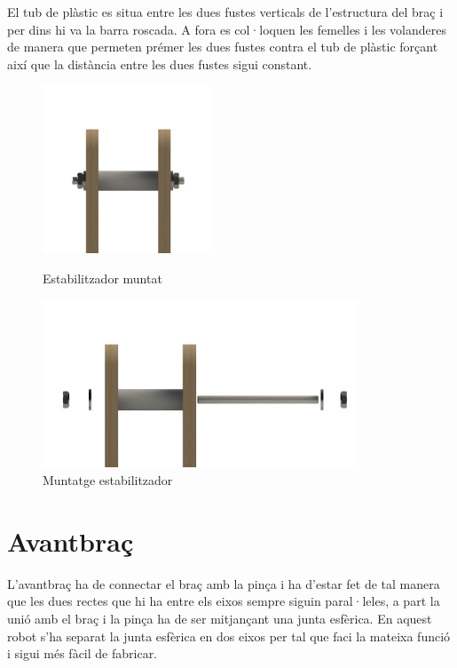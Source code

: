 \documentclass[a4paper, 12pt]{article}
\begin{document}
El tub de plàstic es situa entre les dues fustes verticals de l'estructura del braç i per dins hi va la barra roscada. A fora es col·loquen les femelles i les volanderes de manera que permeten prémer les dues fustes contra el tub de plàstic forçant així que la distància entre les dues fustes sigui constant.

\begin{figure}[h!]
\begin{minipage}[b]{0.45\linewidth}
\centering
\includegraphics[height=5cm]{./imgComp/estab}
\caption{Estabilitzador muntat}
\end{minipage}
\begin{minipage}[b]{0.45\linewidth}
\centering
\includegraphics[height=5cm]{./imgComp/estab_expl}
\caption{Muntatge estabilitzador}
\end{minipage}
\end{figure}


\newpage
\section{Avantbraç}
L'avantbraç ha de connectar el braç amb la pinça i ha d'estar fet de tal manera que les dues rectes que hi ha entre els eixos sempre siguin paral·leles, a part la unió amb el braç i la pinça ha de ser mitjançant una junta esfèrica. En aquest robot s'ha separat la junta esfèrica en dos eixos per tal que faci la mateixa funció i sigui més fàcil de fabricar.
\end{document}
